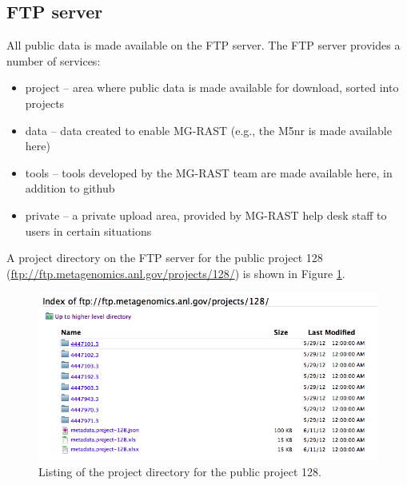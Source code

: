 \documentclass[12pt,fullpage]{report}
\begin{document}
\subsection{FTP server}

All public data is made available on the FTP server.
The FTP server provides a number of services:

\begin{itemize}
\item project --
area where public data is made available for download, sorted into projects

\item data --
data created to enable MG-RAST (e.g., the M5nr is made available here)

\item tools --
tools developed by the MG-RAST team are made available here, in addition to github

\item private --
a private upload area, provided by MG-RAST help desk staff to users in certain situations

\end{itemize}


A project directory on the FTP server for the public project 128 (\url{ftp://ftp.metagenomics.anl.gov/projects/128/})
is shown in Figure \ref{fig:ftp-server-project-view}.

\begin{figure}[ht]
\begin{center}
\includegraphics[width=6in]{Images/ftp-server-project-view.png}
\end{center}
\caption{Listing of the project directory for the public project 128.
}
\label{fig:ftp-server-project-view}
\end{figure}
\end{document}
